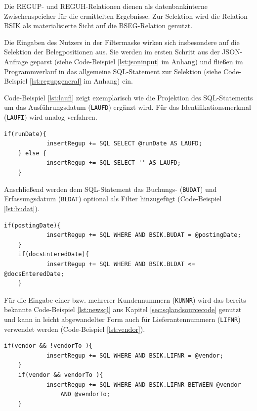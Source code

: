 Die REGUP- und REGUH-Relationen dienen als datenbankinterne Zwischenspeicher für die ermittelten Ergebnisse.
Zur Selektion wird die Relation BSIK als materialisierte Sicht auf die BSEG-Relation genutzt.

Die Eingaben des Nutzers in der Filtermaske wirken sich insbesondere auf die Selektion der Belegpositionen aus.
Sie werden im ersten Schritt aus der JSON-Anfrage geparst (siehe Code-Beispiel \ref{lst:jsoninput} im Anhang) und fließen im Programmverlauf in das allgemeine SQL-Statement zur Selektion (siehe Code-Beispiel \ref{lst:regupgeneral} im Anhang) ein.

Code-Beispiel \ref{lst:laufi} zeigt exemplarisch wie die Projektion des SQL-Statements um das Ausführungsdatum (\texttt{LAUFD}) ergänzt wird.
Für das Identifikationsmerkmal (\texttt{LAUFI}) wird analog verfahren.

\begin{lstlisting}[caption={Ergänzung der Projektion um das Ausführungsdatum}, label={lst:laufi}, language=JavaScriptSQL]
	if(runDate){
			insertRegup += SQL SELECT @runDate AS LAUFD;
	} else {
			insertRegup += SQL SELECT '' AS LAUFD;
	}
\end{lstlisting}

Anschließend werden dem SQL-Statement das Buchungs- (\texttt{BUDAT}) und Erfassungsdatum (\texttt{BLDAT}) optional als Filter hinzugefügt (Code-Beispiel \ref{lst:budat}).

\begin{lstlisting}[caption={Einfügen zusätzlicher Filter}, label={lst:budat}, language=JavaScriptSQL]
	if(postingDate){
			insertRegup += SQL WHERE AND BSIK.BUDAT = @postingDate;
	}
	if(docsEnteredDate){
			insertRegup += SQL WHERE AND BSIK.BLDAT <= @docsEnteredDate;
	}
\end{lstlisting}

Für die Eingabe einer bzw. mehrerer Kundennummern (\texttt{KUNNR}) wird das bereits bekannte Code-Beispiel \ref{lst:newsql} aus Kapitel \ref{sec:sqlandsourcecode} genutzt und kann in leicht abgewandelter Form auch für Lieferantennummern (\texttt{LIFNR}) verwendet werden (Code-Beispiel \ref{lst:vendor}).

\begin{lstlisting}[caption={Unterscheidung zwischen Einzel- und Bereichsfilter}, label={lst:vendor}, language=JavaScriptSQL]
	if(vendor && !vendorTo ){
			insertRegup += SQL WHERE AND BSIK.LIFNR = @vendor;
	}
	if(vendor && vendorTo ){
			insertRegup += SQL WHERE AND BSIK.LIFNR BETWEEN @vendor
				AND @vendorTo;
	}
\end{lstlisting}

